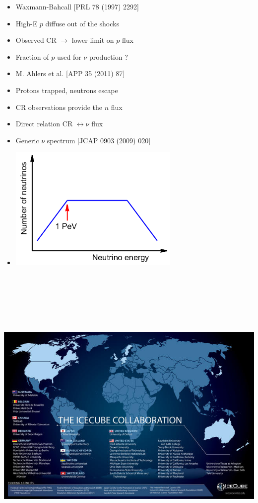\newpage
%
\begin{itemize}
\item {\red Waxmann-Bahcall} {\large [PRL 78 (1997) 2292]}
\item[] High-E $p$ diffuse out of the shocks
\item[] Observed CR $\rightarrow$ lower limit on $p$ flux 
\item[] {\blue Fraction of $p$ used for $\nu$ production ?}
\item {\red M. Ahlers et al.} {\large [APP 35 (2011) 87]}
\item[] Protons trapped, neutrons escape
\item[] CR observations provide the $n$ flux
\item[] {\blue Direct relation CR $\leftrightarrow \nu$ flux}
\item {\red Generic $\nu$ spectrum} {\large [JCAP 0903 (2009) 020]}
\item[] \includegraphics[keepaspectratio,height=6cm]{wb-spectrum}
\end{itemize}

\Tr
\onecolumn
\begin{center}
\includegraphics[keepaspectratio,height=15cm]{icecube-collab2}
\end{center}

